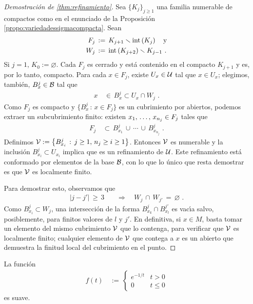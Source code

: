 \begin{proof}[Demostraci\'{o}n de \ref{thm:refinamiento}]
	Sea $\{K_j\}_{j\geq 1}$ una familia numerable de compactos como
	en el enunciado de la Proposici\'{o}n~%
	\ref{propo:variedadessigmacompacta}. Sean
	\begin{align*}
		F_j & \,:=\,K_{j+1}\setmin\interior{K_j} \quad\text{y} \\
		W_j & \,:=\,\interior{K_{j+2}}\setmin K_{j-1}
		\text{ .}
	\end{align*}
	Si $j=1$, $K_0:=\varnothing$. Cada $F_j$ es cerrado y est\'{a}
	contenido en el compacto $K_{j+1}$ y es, por lo tanto, compacto. Para
	cada $x\in F_j$, existe $U_x\in\cal U$ tal que $x\in U_x$; elegimos,
	tambi\'{e}n, $B_x^j\in\cal B$ tal que
	\begin{align*}
		x & \,\in\,B_x^j\subset U_x\cap W_j
		\text{ .}
	\end{align*}
	Como $F_j$ es compacto y $\big\{B_x^j\,:\,x\in F_j\big\}$ es un
	cubrimiento por abiertos, podemos extraer un subcubrimiento finito:
	existen $\lista{x}{n_j}\in F_j$ tales que
	\begin{align*}
		F_j & \,\subset\, B_{x_1}^j\,\cup\,\cdots\,\cup\,
			B_{x_{n_j}}^j
		\text{ .}
	\end{align*}
	Definimos
	\begin{math}
		\cal V:=\big\{B_{x_i}^j\,:\,j\geq 1,\,n_j\geq i\geq 1\big\}
	\end{math}. Entonces $\cal V$ es numerable y la inclusi\'{o}n
	$B_{x_i}^j\subset U_{x_i}$ implica que es un refinamiento de $\cal U$.
	Este refinamiento est\'{a} conformado por elementos de la base
	$\cal B$, con lo que lo \'{u}nico que resta demostrar es que $\cal V$
	es localmente finito.

	Para demostrar esto, observamos que
	\begin{align*}
		|j-j'| \,\geq\,3 & \quad\Rightarrow\quad
			W_j\,\cap\,W_{j'} \,=\,\varnothing
		\text{ .}
	\end{align*}
	Como $B_{x_i}^j\subset W_j$, una intersecci\'{o}n de la forma
	$B_{x_k}^j\cap B_{x_l}^{j'}$ es vac\'{\i}a salvo, posiblemente, para
	finitos valores de $l$ y $j'$. En definitiva, si $x\in M$, basta tomar
	un elemento del mismo cubrimiento $\cal V$ que lo contenga, para
	verificar que $\cal V$ es localmente finito; cualquier elemento de
	$\cal V$ que contega a $x$ es un abierto que demuestra la finitud local
	del cubrimiento en el punto.
\end{proof}

\begin{lemaParticiones}\label{lema:particiones:pendientesuave}
	La funci\'{o}n
	\begin{align*}
		f(t) & \,:=\,
			\begin{cases}
				e^{-1/t} & t>0 \\
				0 & t \leq 0
			\end{cases}
	\end{align*}
	es suave.
\end{lemaParticiones}

